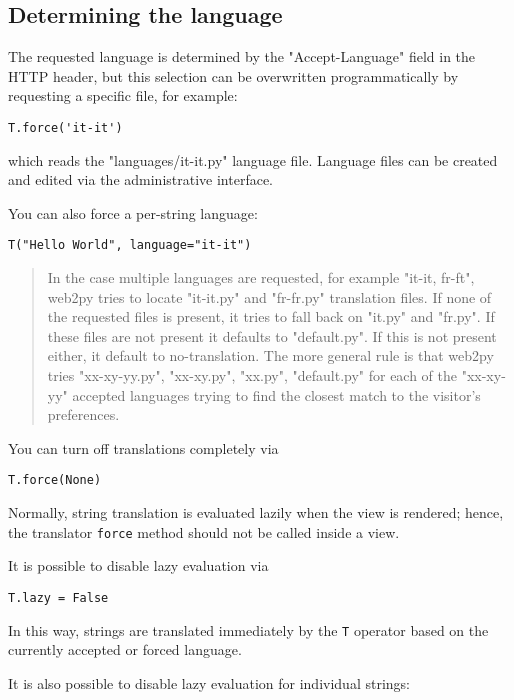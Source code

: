 \documentclass[justified,sixbynine,notoc]{tufte-book}
\def\ft{\small\tt}
\begin{document}
\begin{fullwidth}
\goodbreak\subsection{Determining the language}

The requested language is determined by the "Accept-Language" field in the HTTP header, but this selection can be overwritten programmatically by requesting a specific file, for example:
\begin{lstlisting}
T.force('it-it')
\end{lstlisting}
\noindent which reads the "languages/it-it.py" language file. Language files can be created and edited via the administrative interface.

You can also force a per-string language:

\begin{lstlisting}
T("Hello World", language="it-it")
\end{lstlisting}

\begin{quote}In the case multiple languages are requested, for example "it-it, fr-ft", web2py tries to locate "it-it.py" and "fr-fr.py" translation files. If none of the requested files is present, it tries to fall back on "it.py" and "fr.py". If these files are not present it defaults to "default.py". If this is not present either, it default to no-translation. The more general rule is that web2py tries "xx-xy-yy.py", "xx-xy.py", "xx.py", "default.py" for each of the "xx-xy-yy" accepted languages trying to find the closest match to the visitor's preferences.\end{quote}
You can turn off translations completely via

\begin{lstlisting}
T.force(None)
\end{lstlisting}

Normally, string translation is evaluated lazily when the view is rendered; hence, the translator {\ft force} method should not be called inside a view.

It is possible to disable lazy evaluation via
\begin{lstlisting}
T.lazy = False
\end{lstlisting}

In this way, strings are translated immediately by the {\ft T} operator based on the currently accepted or forced language.

It is also possible to disable lazy evaluation for individual strings:


\end{fullwidth}
\end{document}
